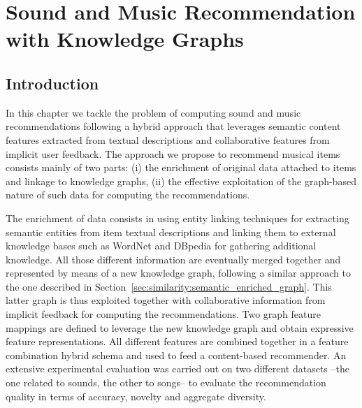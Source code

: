 
\chapter{Sound and Music Recommendation with Knowledge Graphs}
\label{sec:graph-rec}

\section{Introduction}
\label{sec:graph-rec:introduction}

In this chapter we tackle the problem of computing sound and music recommendations following a hybrid approach that leverages semantic content features extracted from textual descriptions and collaborative features from implicit user feedback. 
The approach we propose to recommend musical items consists mainly of two parts: (i) the enrichment of original data attached to items and linkage to knowledge graphs, (ii) the effective exploitation of the graph-based nature of such data for computing the recommendations. 

The enrichment of data consists in using entity linking techniques for extracting semantic entities from item textual descriptions and linking them to external knowledge bases such as WordNet \cite{wordnet} and DBpedia \cite{dbpedia1} for gathering additional knowledge. All those different information are eventually merged together and represented by means of a new knowledge graph, following a similar approach to the one described in Section~\ref{sec:similarity:semantic_enriched_graph}.
This latter graph is thus exploited together with collaborative information from implicit feedback for computing the recommendations. Two graph feature mappings are defined to leverage the new knowledge graph and obtain expressive feature representations. All different features are combined together in a feature combination hybrid schema \cite{Burke2002} and used to feed a content-based recommender. An extensive experimental evaluation was carried out on two different datasets --the one related to sounds, the other to songs-- to evaluate the recommendation quality in terms of accuracy, novelty and aggregate diversity. 

